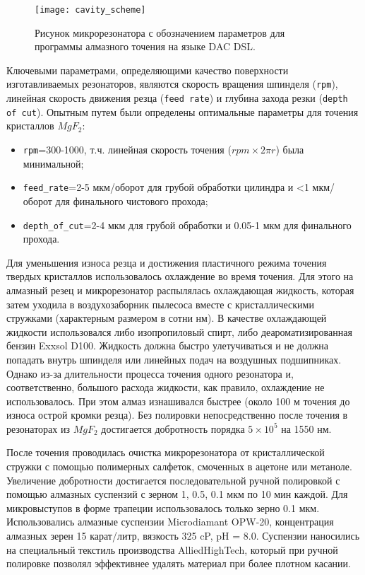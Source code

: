 \begin{figure}[ht]
\centering
  \texttt{[image: cavity\_scheme]}
  \caption{Рисунок микрорезонатора с обозначением параметров для программы алмазного точения на языке DAC DSL.}
  \label{cavity_scheme}
\end{figure}

Ключевыми параметрами, определяющими качество поверхности изготавливаемых резонаторов, являются скорость вращения шпинделя (\texttt{rpm}), линейная скорость движения резца (\texttt{feed rate}) и глубина захода резки (\texttt{depth of cut}). Опытным путем были определены оптимальные параметры для точения кристаллов $MgF_2$:

\begin{itemize}
    \item \texttt{rpm}=300-1000, т.ч. линейная скорость точения ($rpm\times 2\pi r$) была минимальной;
    \item \texttt{feed\_rate}=2-5 мкм/оборот для грубой обработки цилиндра и <1 мкм/оборот для финального чистового прохода;
    \item \texttt{depth\_of\_cut}=2-4 мкм для грубой обработки и 0.05-1 мкм для финального прохода.
\end{itemize}

Для уменьшения износа резца и достижения пластичного режима точения твердых кристаллов использовалось охлаждение во время точения. Для этого на алмазный резец и микрорезонатор распылялась охлаждающая жидкость, которая затем уходила в воздухозаборник пылесоса вместе с кристаллическими стружками (характерным размером в сотни нм). В качестве охлаждающей жидкости использовался либо изопропиловый спирт, либо деароматизированная бензин Exxsol D100. Жидкость должна быстро улетучиваться и не должна попадать внутрь шпинделя или линейных подач на воздушных подшипниках. Однако из-за длительности процесса точения одного резонатора и, соответственно, большого расхода жидкости, как правило, охлаждение не использовалось. При этом алмаз изнашивался быстрее (около 100 м точения до износа острой кромки резца). Без полировки непосредственно после точения в резонаторах из $MgF_2$ достигается добротность порядка $5\times10^5$ на 1550 нм.

После точения проводилась очистка микрорезонатора от кристаллической стружки с помощью полимерных салфеток, смоченных в ацетоне или метаноле. Увеличение добротности достигается последовательной ручной полировкой с помощью алмазных суспензий с зерном 1, 0.5, 0.1 мкм по 10 мин каждой. Для микровыступов в форме трапеции использовалось только зерно 0.1 мкм. Использовались алмазные суспензии Microdiamant OPW-20, концентрация алмазных зерен 15 карат/литр, вязкость 325 cP, pH = 8.0. Суспензии наносились на специальный текстиль производства AlliedHighTech, который при ручной полировке позволял эффективнее удалять материал при более плотном касании.
 
